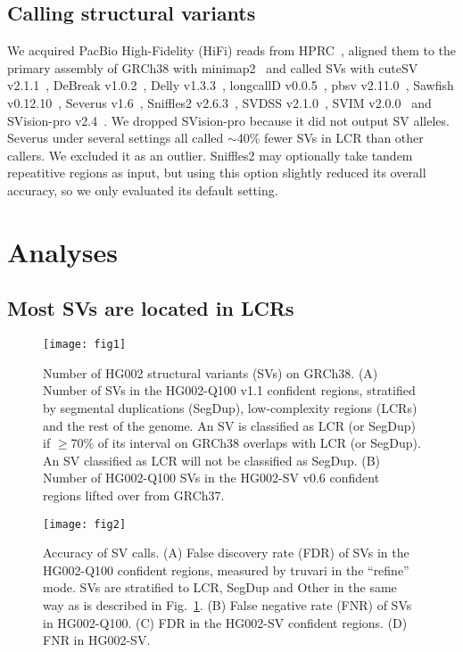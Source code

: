 \documentclass[a4paper,num-refs]{oup-contemporary}
\begin{document}
\subsection{Calling structural variants}

We acquired PacBio High-Fidelity (HiFi) reads from HPRC~\cite{hifi-read},
aligned them to the primary assembly of GRCh38 with minimap2~\cite{Li:2018ab}
and called SVs with
cuteSV v2.1.1~\cite{Jiang:2020aa},
DeBreak v1.0.2~\cite{Chen:2023aa},
Delly v1.3.3~\cite{Rausch:2012aa},
longcallD v0.0.5~\cite{longcalld},
pbsv v2.11.0~\cite{pbsv},
Sawfish v0.12.10~\cite{Saunders:2025aa},
Severus v1.6~\cite{Keskus:2025aa},
Sniffles2 v2.6.3~\cite{Smolka:2024ab},
SVDSS v2.1.0~\cite{Denti:2023aa},
SVIM v2.0.0~\cite{Heller:2019aa}
and SVision-pro v2.4~\cite{Wang:2025aa}.
We dropped SVision-pro because it did not output SV alleles.
Severus under several settings all called $\sim$40\% fewer SVs in LCR than other callers.
We excluded it as an outlier.
Sniffles2 may optionally take tandem repeatitive regions as input,
but using this option slightly reduced its overall accuracy, so we only evaluated its default setting.

\section{Analyses}

\subsection{Most SVs are located in LCRs}

\begin{figure}[tb]
\texttt{[image: fig1]}
\caption{Number of HG002 structural variants (SVs) on GRCh38.
(A) Number of SVs in the HG002-Q100 v1.1 confident regions,
stratified by segmental duplications (SegDup),
low-complexity regions (LCRs) and the rest of the genome.
An SV is classified as LCR (or SegDup) if $\ge$70\% of its interval on GRCh38 overlaps with LCR (or SegDup).
An SV classified as LCR will not be classified as SegDup.
(B) Number of HG002-Q100 SVs in the HG002-SV v0.6 confident regions lifted over from GRCh37.}\label{fig:count}
\end{figure}

\begin{figure}[!tb]
\texttt{[image: fig2]}
\caption{Accuracy of SV calls.
(A) False discovery rate (FDR) of SVs in the HG002-Q100 confident regions, measured by truvari in the ``refine'' mode.
SVs are stratified to LCR, SegDup and Other in the same way as is described in Fig.~\ref{fig:count}.
(B) False negative rate (FNR) of SVs in HG002-Q100.
(C) FDR in the HG002-SV confident regions.
(D) FNR in HG002-SV.}\label{fig:acc}
\end{figure}
\end{document}
